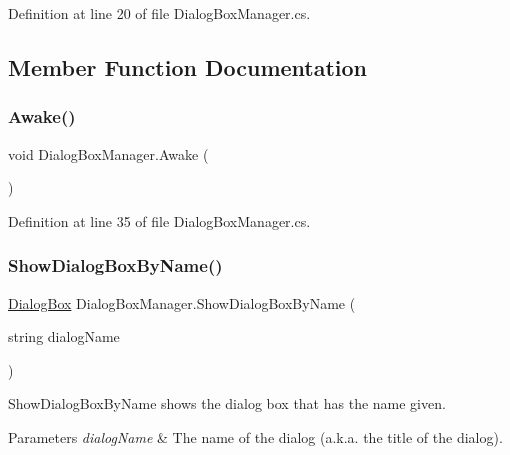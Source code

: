 Definition at line 20 of file Dialog\+Box\+Manager.\+cs.



\subsection{Member Function Documentation}
\mbox{\label{class_dialog_box_manager_a28224e3447ddefd0e824d2038630136b}} 
\subsubsection{\texorpdfstring{Awake()}{Awake()}}
{\footnotesize\ttfamily void Dialog\+Box\+Manager.\+Awake (\begin{DoxyParamCaption}{ }\end{DoxyParamCaption})}



Definition at line 35 of file Dialog\+Box\+Manager.\+cs.

\mbox{\label{class_dialog_box_manager_a1ae6b99dbcda36d12d2588efdfd04cbb}} 
\subsubsection{\texorpdfstring{Show\+Dialog\+Box\+By\+Name()}{ShowDialogBoxByName()}}
{\footnotesize\ttfamily \hyperlink{class_dialog_box}{Dialog\+Box} Dialog\+Box\+Manager.\+Show\+Dialog\+Box\+By\+Name (\begin{DoxyParamCaption}\item[{string}]{dialog\+Name }\end{DoxyParamCaption})}



Show\+Dialog\+Box\+By\+Name shows the dialog box that has the name given. 


\begin{DoxyParams}{Parameters}
{\em dialog\+Name} & The name of the dialog (a.\+k.\+a. the title of the dialog).\\
\hline
\end{DoxyParams}


